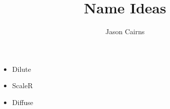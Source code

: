 \documentclass[a4paper,10pt]{article}
\begin{document}
\title{Name Ideas}
\author{Jason Cairns}
  
\maketitle{}

\begin{itemize}
	\item Dilute
	\item ScaleR
	\item Diffuse
\end{itemize}
\end{document}
